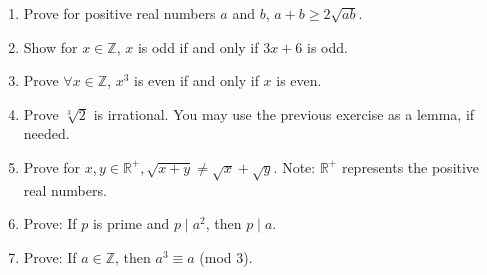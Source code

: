 \documentclass{article}
\begin{document}
\begin{enumerate}
\item Prove for positive real numbers $a$ and $b$, \(a+b \ge 2 \sqrt{ab}\).

\item Show for \(x\in\mathbb{Z}\), $x$ is odd if and only if $3x+6$ is odd.

\item Prove \(\forall x\in\mathbb{Z}\), \(x^3\) is even if and only if \(x\) is even.

\item Prove \( \sqrt[3]{2} \) is irrational. You may use the previous exercise as a lemma, if needed.
    
\item Prove for \(x,y\in\mathbb{R^+}, \sqrt{x+y}\ne\sqrt{x} +\sqrt{y}\).  Note: \(\mathbb{R^+}\) represents the positive real numbers.

\item Prove: If $p$ is prime and $p\mid a^2$, then $p\mid a$.

\item Prove: If $a \in\mathbb{Z}$, then $a^3 \equiv a$ (mod 3).

\end{enumerate}
\end{document}
